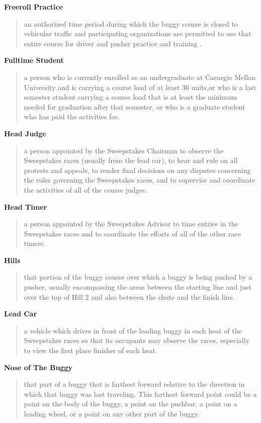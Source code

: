 \textbf{Freeroll Practice}
\begin{quote}
	an authorized time period during which the buggy course is closed to vehicular traffic and participating organizations are permitted to use that entire course for driver and pusher practice and training .
\end{quote}

\textbf{Fulltime Student}
\begin{quote}
	a person who is currently enrolled as an undergraduate at Carnegie Mellon University and is carrying a course load of at least 36 units,or who is a last semester student carrying a course load that is at least the minimum needed for graduation after that semester, or who is a graduate student who has paid the activities fee.
\end{quote}

\textbf{Head Judge}
\begin{quote}
	a person appointed by the Sweepstakes Chairman to observe the Sweepstakes races (usually from the lead car), to hear and rule on all protests and appeals, to render final decisions on any disputes concerning the rules governing the Sweepstakes races, and to supervise and coordinate the activities of all of the course judges.
\end{quote}

\textbf{Head Timer}
\begin{quote}
	a person appointed by the Sweepstakes Advisor to time entries in the Sweepstakes races and to coordinate the efforts of all of the other race timers.
\end{quote}

\textbf{Hills}
\begin{quote}
	that portion of the buggy course over which a buggy is being pushed by a pusher, usually encompassing the areas between the starting line and just over the top of Hill 2 and also between the chute and the finish line.
\end{quote}

\textbf{Lead Car}
\begin{quote}
	a vehicle which drives in front of the leading buggy in each heat of the Sweepstakes races so that its occupants may observe the races, especially to view the first place finisher of each heat.
\end{quote}

\textbf{Nose of The Buggy}
\begin{quote}
	that part of a buggy that is farthest forward relative to the direction in which that buggy was last traveling. This farthest forward point could be a point on the body of the buggy, a point on the pushbar, a point on a leading wheel, or a point on any other part of the buggy.
\end{quote}

